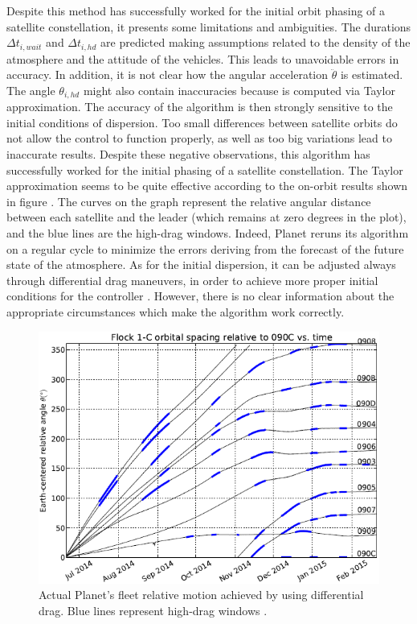 \begin{itemize}
Despite this method has successfully worked for the initial orbit phasing of a satellite constellation, it presents some limitations and ambiguities.
The durations $\Delta t_{i,wait}$ and $\Delta t_{i,hd}$ are predicted making assumptions related to the density of the atmosphere and the attitude of the vehicles.
This leads to unavoidable errors in accuracy.
In addition, it is not clear how the angular acceleration $\ddot{\theta}$ is estimated.
The angle $\theta_{i,hd}$ might also contain inaccuracies because is computed via Taylor approximation.
The accuracy of the algorithm is then strongly sensitive to the initial conditions of dispersion.
Too small differences between satellite orbits do not allow the control to function properly, as well as too big variations lead to inaccurate results.
Despite these negative observations, this algorithm has successfully worked for the initial phasing of a satellite constellation.
The Taylor approximation seems to be quite effective according to the on-orbit results shown in figure \cite{lee2017cubesat}.
The curves on the graph represent the relative angular distance between each satellite and the leader (which remains at zero degrees in the plot), and the blue lines are the high-drag windows.  
Indeed, Planet reruns its algorithm on a regular cycle to minimize the errors deriving from the forecast of the future state of the atmosphere.
As for the initial dispersion, it can be adjusted always through differential drag maneuvers, in order to achieve more proper initial conditions for the controller \cite{foster2015orbit}.
However, there is no clear information about the appropriate circumstances which make the algorithm work correctly.

\begin{figure}
      \centering
      \includegraphics[scale=0.8]{img/planet_orbit_results.png}
      \caption{Actual Planet's fleet relative motion achieved by using differential drag. 
      Blue lines represent high-drag windows \cite{foster2015orbit}.}
      \label{kep_high_ecc_fig}
\end{figure}


\end{itemize}
